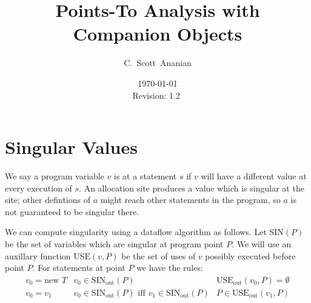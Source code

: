 \documentclass[11pt,notitlepage]{article}
\author{C.~Scott~Ananian}
\title{Points-To Analysis with Companion Objects}
\date{\today \\ $ $Revision: 1.2 $ $}
\begin{document}
%
\maketitle
\section{Singular Values}

We say a program variable $v$ is  at a statement $s$
if $v$ will have a different value at every execution of $s$.  An
allocation site  produces a value which is singular
at the site; other defintions of $a$ might reach other statements in
the program, so $a$ is not guaranteed to be singular there.

We can compute singularity using a dataflow algorithm as follows.
Let $\text{SIN}(P)$ be the set of variables which are singular
at program point $P$.  We will use an auxillary function
$\text{USE}(v, P)$ be the set of uses of $v$ possibly executed before
point $P$.  For statements at point $P$ we have the rules:
\begin{displaymath}
\begin{array}{lll}
v_0 = \text{new } T & v_0 \in \text{SIN}_{\text{out}}(P)
                    & \text{USE}_{\text{out}}(v_0, P) = \emptyset \\
v_0 = v_1 & v_0 \in \text{SIN}_{\text{out}}(P) \text{ iff }
            v_1 \in \text{SIN}_{\text{out}}(P)
          & P \in \text{USE}_{\text{out}}(v_1, P) \\

%
\end{array}
\end{displaymath}
\end{document}
